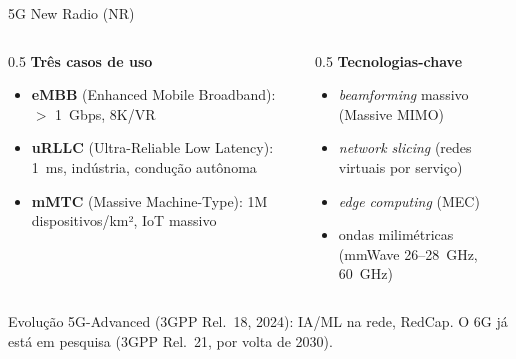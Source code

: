 \documentclass[aspectratio=169,11pt]{beamer}
\begin{document}
\begin{frame}{5G New Radio (NR)}
  \begin{columns}
    \begin{column}{0.5\textwidth}
      \textbf{Três casos de uso}
      \begin{itemize}
        \item \textbf{eMBB} (Enhanced Mobile Broadband): $>$ 1~Gbps, 8K/VR
        \item \textbf{uRLLC} (Ultra-Reliable Low Latency): 1~ms, indústria, condução autônoma
        \item \textbf{mMTC} (Massive Machine-Type): 1M dispositivos/km², IoT massivo
      \end{itemize}
    \end{column}
    \begin{column}{0.5\textwidth}
      \textbf{Tecnologias-chave}
      \begin{itemize}
        \item \emph{beamforming} massivo (Massive MIMO)
        \item \emph{network slicing} (redes virtuais por serviço)
        \item \emph{edge computing} (MEC)
        \item ondas milimétricas (mmWave 26--28~GHz, 60~GHz)
      \end{itemize}
    \end{column}
  \end{columns}
  \pause
  \begin{exampleblock}{Evolução}
    5G-Advanced (3GPP Rel.\ 18, 2024): IA/ML na rede, RedCap. O 6G já está em pesquisa (3GPP Rel.\ 21, por volta de 2030).
  \end{exampleblock}
\end{frame}
\end{document}
